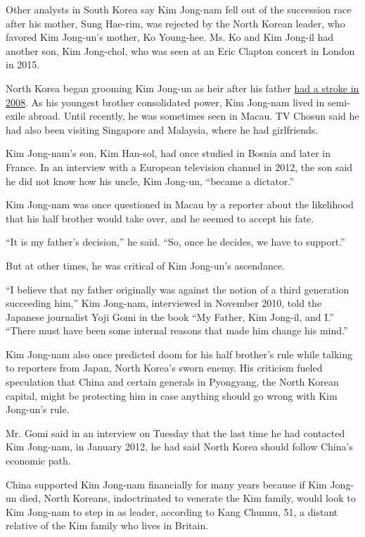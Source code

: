 Other analysts in South Korea say Kim Jong-nam fell out of the
succession race after his mother, Sung Hae-rim, was rejected by the
North Korean leader, who favored Kim Jong-un's mother, Ko Young-hee. Ms.
Ko and Kim Jong-il had another son, Kim Jong-chol, who was seen at an
Eric Clapton concert in London in 2015.

North Korea began grooming Kim Jong-un as heir after his father
\href{http://www.nytimes3xbfgragh.onion/2008/12/12/world/asia/12kim.html}{had
a stroke in 2008}. As his youngest brother consolidated power, Kim
Jong-nam lived in semi-exile abroad. Until recently, he was sometimes
seen in Macau. TV Chosun said he had also been visiting Singapore and
Malaysia, where he had girlfriends.

Kim Jong-nam's son, Kim Han-sol, had once studied in Bosnia and later in
France. In an interview with a European television channel in 2012, the
son said he did not know how his uncle, Kim Jong-un, ``became a
dictator.''

Kim Jong-nam was once questioned in Macau by a reporter about the
likelihood that his half brother would take over, and he seemed to
accept his fate.

``It is my father's decision,'' he said. ``So, once he decides, we have
to support.''

But at other times, he was critical of Kim Jong-un's ascendance.

``I believe that my father originally was against the notion of a third
generation succeeding him,'' Kim Jong-nam, interviewed in November 2010,
told the Japanese journalist Yoji Gomi in the book ``My Father, Kim
Jong-il, and I.'' ``There must have been some internal reasons that made
him change his mind.''

Kim Jong-nam also once predicted doom for his half brother's rule while
talking to reporters from Japan, North Korea's sworn enemy. His
criticism fueled speculation that China and certain generals in
Pyongyang, the North Korean capital, might be protecting him in case
anything should go wrong with Kim Jong-un's rule.

Mr. Gomi said in an interview on Tuesday that the last time he had
contacted Kim Jong-nam, in January 2012, he had said North Korea should
follow China's economic path.

China supported Kim Jong-nam financially for many years because if Kim
Jong-un died, North Koreans, indoctrinated to venerate the Kim family,
would look to Kim Jong-nam to step in as leader, according to Kang
Chunnu, 51, a distant relative of the Kim family who lives in Britain.

